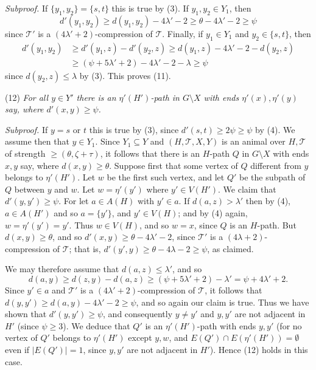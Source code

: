 \textit{Subproof.} If $\{y_1, y_2\} = \{s, t\}$ this is true by (3). If $y_1, y_2 \in Y_1$, then
\begin{equation*}
d'(y_1, y_2) \ge d(y_1, y_2) - 4\lambda' - 2 \ge \theta - 4\lambda' - 2 \ge \psi
\end{equation*}
since $\mathscr{T}'$ is a $(4\lambda' + 2)$-compression of $\mathscr{T}$. Finally, if $y_1 \in Y_1$ and $y_2 \in \{s, t\}$, then
\begin{align*}
d'(y_1, y_2) &\ge d'(y_1, z) - d'(y_2, z) \ge d(y_1, z) - 4\lambda' - 2 - d(y_2, z) \\
&\ge (\psi + 5\lambda' + 2) - 4\lambda' - 2 - \lambda \ge \psi
\end{align*}
since $d(y_2, z) \le \lambda$ by (3). This proves (11).

\hspace*{12pt}(12) \textit{For all $y \in Y'$ there is an $\eta'(H')$-path in $G \setminus X$ with ends $\eta'(x), \eta'(y)$ say, where $d'(x, y) \ge \psi$.}

\textit{Subproof.} If $y = s$ or $t$ this is true by (3), since $d'(s, t) \ge 2\psi \ge \psi$ by (4). We assume then that $y \in Y_1$. Since $Y_1 \subseteq Y$ and $(H, \mathscr{T}, X, Y)$ is an animal over $H, \mathscr{T}$ of strength $\ge (\theta, \zeta + \tau)$, it follows that there is an $H$-path $Q$ in $G \setminus X$ with ends $x, y$ say, where $d(x, y) \ge \theta$. Suppose first that some vertex of $Q$ different from $y$ belongs to $\eta'(H')$. Let $w$ be the first such vertex, and let $Q'$ be the subpath of $Q$ between $y$ and $w$. Let $w = \eta'(y')$ where $y' \in V(H')$. We claim that $d'(y, y') \ge \psi$. For let $a \in A(H)$ with $y' \in a$. If $d(a, z) > \lambda'$ then by (4), $a \in A(H')$ and so $a = \{y'\}$, and $y' \in V(H)$; and by (4) again, $w = \eta'(y') = y'$. Thus $w \in V(H)$, and so $w = x$, since $Q$ is an $H$-path. But $d(x, y) \ge \theta$, and so $d'(x, y) \ge \theta - 4\lambda' - 2$, since $\mathscr{T}'$ is a $(4\lambda + 2)$-compression of $\mathscr{T}$; that is, $d'(y', y) \ge \theta - 4\lambda - 2 \ge \psi$, as claimed.

We may therefore assume that $d(a, z) \le \lambda'$, and so
\begin{equation*}
d(a, y) \ge d(z, y) - d(a, z) \ge (\psi + 5\lambda' + 2) - \lambda' = \psi + 4\lambda' + 2.
\end{equation*}
Since $y' \in a$ and $\mathscr{T}'$ is a $(4\lambda' + 2)$-compression of $\mathscr{T}$, it follows that $d(y, y') \ge d(a, y) - 4\lambda' - 2 \ge \psi$, and so again our claim is true. Thus we have shown that $d'(y, y') \ge \psi$, and consequently $y \ne y'$ and $y, y'$ are not adjacent in $H'$ (since $\psi \ge 3$). We deduce that $Q'$ is an $\eta'(H')$-path with ends $y, y'$ (for no vertex of $Q'$ belongs to $\eta'(H')$ except $y, w$, and $E(Q') \cap E(\eta'(H')) = \emptyset$ even if $|E(Q')| = 1$, since $y, y'$ are not adjacent in $H'$). Hence (12) holds in this case.

